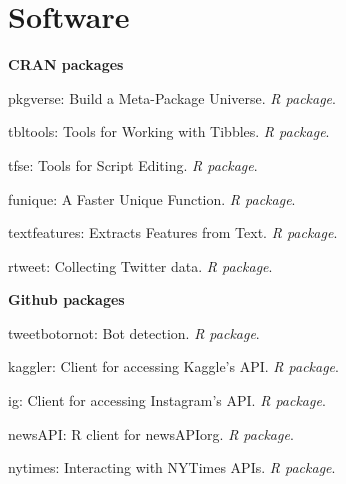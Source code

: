 \section{Software}

  \textbf{CRAN packages}
    \begin{innerlist}
      \item pkgverse: Build a Meta-Package Universe. \textit{R package}. \href{http://cran.r-project.org/package=pkgverse}{\faExternalLink}
      \item tbltools: Tools for Working with Tibbles. \textit{R package}. \href{http://cran.r-project.org/package=tbltools}{\faExternalLink}
      \item tfse: Tools for Script Editing. \textit{R package}. \href{http://cran.r-project.org/package=tfse}{\faExternalLink}
      \item funique: A Faster Unique Function. \textit{R package}. \href{http://cran.r-project.org/package=funique}{\faExternalLink}
      \item textfeatures: Extracts Features from Text. \textit{R package}. \href{http://cran.r-project.org/package=textfeatures}{\faExternalLink}
      \item rtweet: Collecting Twitter data. \textit{R package}. \href{http://cran.r-project.org/package=rtweet}{\faExternalLink}
    \end{innerlist}\vspace{1em}

  \textbf{Github packages}
    \begin{innerlist}
      \item tweetbotornot: Bot detection. \textit{R package}. \href{https://github.com/mkearney/tweetbotornot}{\faExternalLink}
      \item kaggler: Client for accessing Kaggle’s API. \textit{R package}. \href{https://github.com/mkearney/kaggler}{\faExternalLink}
      \item ig: Client for accessing Instagram's API. \textit{R package}. \href{https://github.com/mkearney/ig}{\faExternalLink}
      \item newsAPI: R client for newsAPIorg. \textit{R package}. \href{https://github.com/mkearney/newsAPI}{\faExternalLink}
      \item nytimes: Interacting with NYTimes APIs. \textit{R package}. \href{https://github.com/mkearney/nytimes}{\faExternalLink}
    \end{innerlist}\vspace{1em}

